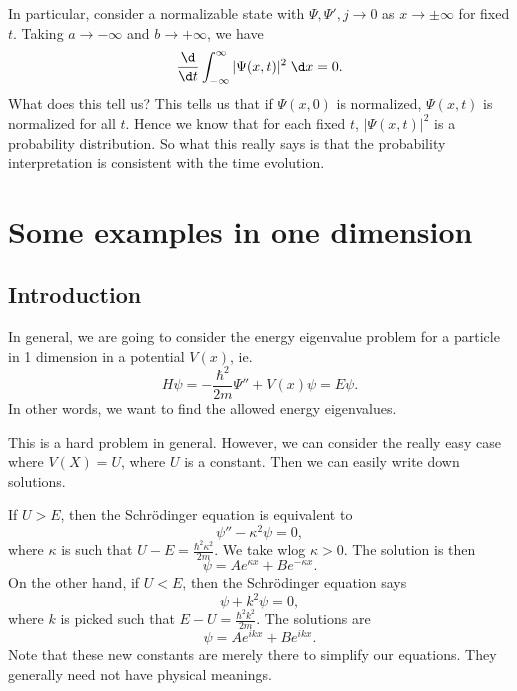 \documentclass[a4paper]{article}
\begin{document}
In particular, consider a normalizable state with $\Psi, \Psi', j \to 0$ as $x \to \pm\infty$ for fixed $t$. Taking $a \to -\infty$ and $b\to +\infty$, we have
\[
  \frac{\d}{\d t}\int_{-\infty}^\infty |\Psi(x, t)|^2 \;\d x = 0.
\]
What does this tell us? This tells us that if $\Psi(x, 0)$ is normalized, $\Psi(x, t)$ is normalized for all $t$. Hence we know that for each fixed $t$, $|\Psi(x, t)|^2$ is a probability distribution. So what this really says is that the probability interpretation is consistent with the time evolution.

\section{Some examples in one dimension}
\subsection{Introduction}
In general, we are going to consider the energy eigenvalue problem for a particle in 1 dimension in a potential $V(x)$, ie.
\[
  H\psi = -\frac{\hbar^2}{2m}\Psi'' + V(x) \psi = E\psi.
\]
In other words, we want to find the allowed energy eigenvalues.

This is a hard problem in general. However, we can consider the really easy case where $V(X) = U$, where $U$ is a constant. Then we can easily write down solutions.

If $U > E$, then the Schr\"odinger equation is equivalent to
\[
  \psi'' - \kappa^2 \psi = 0,
\]
where $\kappa$ is such that $U - E = \frac{\hbar^2 \kappa^2}{2m}$. We take wlog $\kappa > 0$. The solution is then
\[
  \psi = Ae^{\kappa x} + Be^{-\kappa x}.
\]
On the other hand, if $U < E$, then the Schr\"odinger equation says
\[
  \psi + k^2 \psi = 0,
\]
where $k$ is picked such that $E - U = \frac{\hbar^2 k^2}{2m}$. The solutions are
\[
  \psi = Ae^{ikx} + Be^{ikx}.
\]
Note that these new constants are merely there to simplify our equations. They generally need not have physical meanings.
\end{document}
